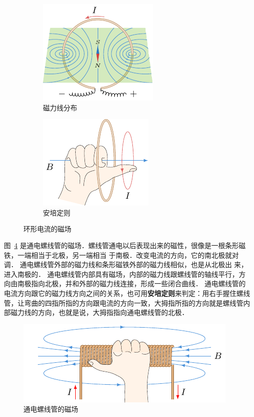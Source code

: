 \begin{figure}[htbp]
	\centering
	\begin{subfigure}{0.4\linewidth}
		\centering
		\includegraphics{fig/C/1-7a.pdf}
		\caption{磁力线分布}\label{fig_C_1-7a}
	\end{subfigure}
	\hfil
	\begin{subfigure}{0.4\linewidth}
		\centering
		\includegraphics{fig/C/1-7b.pdf}
		\caption{安培定则}\label{fig_C_1-7b}
	\end{subfigure}
	\caption{环形电流的磁场}\label{fig_C_1-7}
\end{figure}




图~\ref{fig_C_1-8} 是通电螺线管的磁场．螺线管通电以后表现出来的磁性，很像是一根条形磁铁，一端相当于北极，另一端相当
于南极．改变电流的方向，它的南北极就对调．
通电螺线管外部的磁力线和条形磁铁外部的磁力线相似，也是从北极出
来，进入南极的．
通电螺线管内部具有磁场，内部的磁力线跟螺线管的轴线平行，方向由南极指向北极，并和外部的磁力线连接，形成一些闭合曲线．
通电螺线管的电流方向跟它的磁力线方向之间的关系，也可用\textbf{安培定则}来判定：用右手握住螺线管，让弯曲的四指所指的方向跟电流的方向一致，大拇指所指的方向就是螺线管内部磁力线的方向，也就是说，大拇指指向通电螺线管的北极．

\begin{figure}[htbp]
	\centering
	\includegraphics{fig/C/1-8.pdf}
	\caption{通电螺线管的磁场}\label{fig_C_1-8}
\end{figure}



